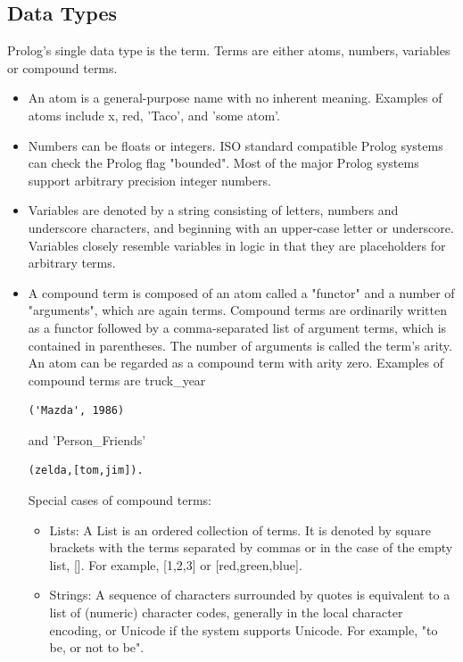\documentclass[14pt]{article}
\begin{document}
\subsection{Data Types}
Prolog's single data type is the term. Terms are either atoms, numbers, variables or compound terms.
\begin{itemize}
\item An atom is a general-purpose name with no inherent meaning. Examples of atoms include x, red, 'Taco', and 'some atom'.

\item Numbers can be floats or integers. ISO standard compatible Prolog systems can check the Prolog flag "bounded". Most of the major Prolog systems support arbitrary precision integer numbers.

\item Variables are denoted by a string consisting of letters, numbers and underscore characters, and beginning with an upper-case letter or underscore. Variables closely resemble variables in logic in that they are placeholders for arbitrary terms.

\item A compound term is composed of an atom called a "functor" and a 
number of "arguments", which are again terms. Compound terms are 
ordinarily written as a functor followed by a comma-separated list of 
argument terms, which is contained in parentheses. The number of arguments is called the term's arity. An atom can be regarded as a compound term with arity zero. Examples of compound terms are truck\_year 
\begin{verbatim}('Mazda', 1986)\end{verbatim} and 
'Person\_Friends' \begin{verbatim}(zelda,[tom,jim]).\end{verbatim}
Special cases of compound terms:
\begin{itemize}
\item Lists: A List is an ordered collection of terms. It is denoted by square brackets with the terms separated by commas or in the case of the empty list, []. For example, [1,2,3] or [red,green,blue].

\item Strings: A sequence of characters surrounded by quotes is equivalent to a list of (numeric) character codes, generally in the local character encoding, or Unicode if the system supports Unicode. For example, "to be, or not to be".
\end{itemize}
\end{itemize}
\end{document}
